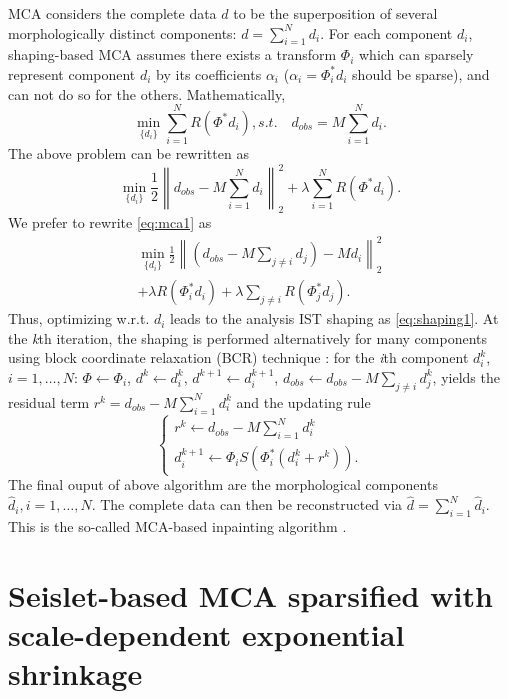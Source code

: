 MCA considers the complete data $d$ to be the superposition of several morphologically distinct components: $d=\sum_{i=1}^Nd_i$. For each component $d_i$, shaping-based MCA assumes there exists a transform $\Phi_i$ which can sparsely represent component $d_i$ by its coefficients $\alpha_i$ ($\alpha_i=\Phi_i^{*}d_i$ should be sparse), and can not do so for the others. Mathematically,
\begin{equation}\label{eq:mca_un}
  \min_{\{d_i\}}\sum_{i=1}^{N}R(\Phi^{*}d_i), s.t.\quad  d_{obs}=M\sum_{i=1}^{N}d_i.
\end{equation}
The above problem can be rewritten as
\begin{equation}\label{eq:mca1}
  \min_{\{d_i\}}\frac{1}{2}\left\|d_{obs}-M\sum_{i=1}^Nd_i\right\|_2^2+\lambda \sum_{i=1}^NR(\Phi^{*}d_i).
\end{equation}
We prefer to rewrite \eqref{eq:mca1} as
\begin{eqnarray}
  \min_{\{d_i\}}\frac{1}{2}\left\|\left(d_{obs}-M\sum_{j\neq i}d_j\right)-Md_i\right\|_2^2 \nonumber\\
   +\lambda R(\Phi_i^{*}d_i)+\lambda \sum_{j\neq i}R(\Phi_j^{*}d_j).
\end{eqnarray}
Thus, optimizing w.r.t. $d_i$ leads to the analysis IST shaping as \eqref{eq:shaping1}. At the \emph{k}th iteration, the shaping is performed alternatively for many components using block coordinate relaxation (BCR) technique \citep{bruce1998block}: for the \emph{i}th component $d_i^{k}$, $i=1,\ldots,N$: $\Phi\leftarrow \Phi_i$, $d^{k}\leftarrow d_i^{k}$, $d^{k+1}\leftarrow d_i^{k+1}$, $d_{obs}\leftarrow d_{obs}-M\sum_{j\neq i}d_j^{k}$, yields the residual term $r^{k}=d_{obs}-M\sum_{i=1}^N d_i^{k}$ and the updating rule
\begin{equation}\label{eq:mca2}
  \left\{
  \begin{array}{l}
    r^{k}\leftarrow d_{obs}-M\sum_{i=1}^N d_i^{k}  \\
    d_i^{k+1}\leftarrow \Phi_i S(\Phi_i^{*}(d_i^{k}+r^{k})).
  \end{array}
  \right.
\end{equation}
The final ouput of above algorithm are the morphological components $\hat{d}_i,i=1,\ldots,N$. The complete data can then be reconstructed via $\hat{d}=\sum_{i=1}^N \hat{d}_i$.
This is the so-called MCA-based inpainting algorithm \citep{Elad2005}.


\section{Seislet-based MCA sparsified with scale-dependent exponential shrinkage}

